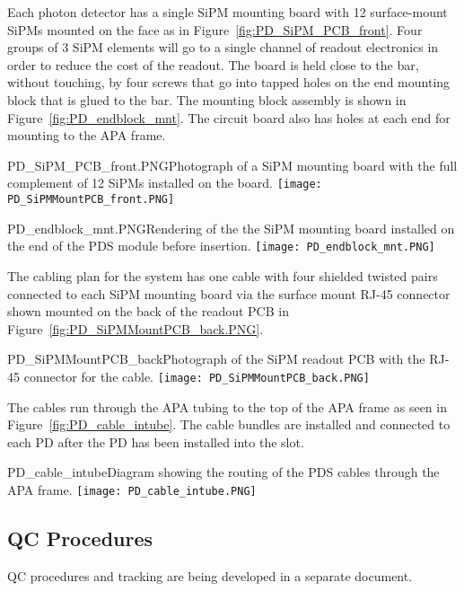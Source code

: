 
Each photon detector has a single SiPM mounting board with 12 surface-mount SiPMs 
mounted on the face as in Figure~\ref{fig:PD_SiPM_PCB_front}.
Four groups of $3$ SiPM elements will go to a single 
channel of readout electronics in order to reduce the cost of the readout.
The board is held close to the bar, without touching, by four screws that go into 
tapped holes on the end mounting block that is glued to the bar.  
The mounting block assembly is shown in Figure~\ref{fig:PD_endblock_mnt}.
The circuit board also has holes at each end for mounting to the APA frame.  
\begin{cdrfigure}
  {PD_SiPM_PCB_front.PNG}{Photograph of a SiPM mounting board
    with the full complement of 12 SiPMs installed on the board.}
\texttt{[image: PD\_SiPMMountPCB\_front.PNG]}
\end{cdrfigure}
\begin{cdrfigure}
  {PD_endblock_mnt.PNG}{Rendering of the the SiPM mounting board
    installed on the end of the PDS module before insertion.}
\texttt{[image: PD\_endblock\_mnt.PNG]}
\end{cdrfigure}


The cabling plan for the system has one cable with four shielded twisted pairs 
connected to each SiPM mounting board via the surface mount RJ-45 connector
shown mounted on the back of the readout PCB in 
Figure~\ref{fig:PD_SiPMMountPCB_back.PNG}.  
\begin{cdrfigure}
  {PD_SiPMMountPCB_back}{Photograph of the SiPM readout PCB with the 
    RJ-45 connector for the cable.}
\texttt{[image: PD\_SiPMMountPCB\_back.PNG]}
\end{cdrfigure}
The cables run through the APA tubing to the top of the APA frame as seen
in Figure~\ref{fig:PD_cable_intube}.
The cable bundles are installed and connected to each PD 
after the PD has been installed into the slot.
\begin{cdrfigure}
  {PD_cable_intube}{Diagram showing the routing of the PDS cables
    through the APA frame.}
\texttt{[image: PD\_cable\_intube.PNG]}
\end{cdrfigure}



\subsection{QC Procedures}
QC procedures and tracking are being developed in a separate document.


